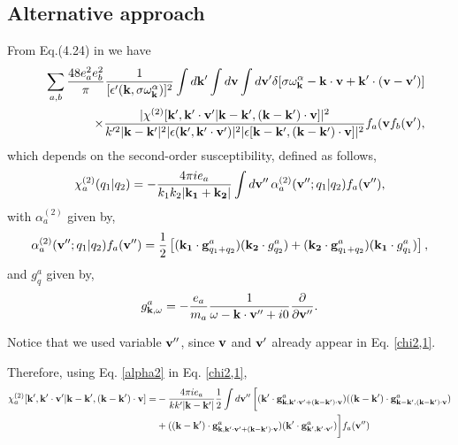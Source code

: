 \documentclass[12pt,a4paper,ruledheader]{report}
\begin{document}
\begin{appendix}
\section{Alternative approach}
From Eq.(4.24) in \cite{YZKS16} we have
\begin{eqnarray}
\label{Eq4.24}
&&
\sum_{a,b}\frac{48e_a^2e_b^2}{\pi}\frac{1}{[\epsilon'({\bf k},\sigma
\omega_{\bf k}^\alpha)]^2}\int d{\bf k'}\int d{\bf v}\int d{\bf v'}
\delta[\sigma\omega_{\bf k}^\alpha-{\bf k\cdot v}+{\bf k'}\cdot
({\bf v-v'})]\\
&&
\times \frac{|\chi^{(2)}[{\bf k'},{\bf k'\cdot v'}|{\bf k-k'},({\bf k-k'})\cdot
{\bf v}]|^2}{k'^2|{\bf k-k'}|^2|\epsilon({\bf k'},{\bf k'\cdot v'})|^2|
\epsilon[{\bf k-k'},({\bf k-k'})\cdot {\bf v}]|^2}f_a({\bf v}f_b({\bf v'}),
\nonumber
\end{eqnarray}
which depends on the second-order susceptibility, defined as follows,
\begin{eqnarray}
\label{chi2,1}
\chi_a^{(2)} (q_1|q_2)=-\frac{4\pi i e_a}{k_1k_2|{\bf k_1}+{\bf k_2}|}
\int d{\bf v''}\, \alpha_a^{(2)}({\bf v''};q_1|q_2)f_a({\bf v''}),
\end{eqnarray}
with $\alpha_a^{(2)}$ given by,
\begin{eqnarray}
\label{alpha2}
\alpha_a^{(2)}({\bf v''};q_1|q_2)f_a({\bf v''})=\frac{1}{2}\left[
({\bf k_1}\cdot{\bf g}_{q_1+q_2}^a)({\bf k_2}\cdot g_{q_2}^a)
+({\bf k_2}\cdot{\bf g}_{q_1+q_2}^a)({\bf k_1}\cdot g_{q_1}^a)\right],
\end{eqnarray}
and $g_q^a$ given by,
\begin{eqnarray}
\label{goper}
g_{{\bf k},\omega}^a=-\frac{e_a}{m_a}\frac{1}{\omega-{\bf k}\cdot{\bf v''}+i0}
\frac{\partial}{\partial {\bf v''}}.
\end{eqnarray}

Notice that we used variable ${\bf v''}$, since ${\bf v}$ and ${\bf v'}$ 
already appear in Eq. \eqref{chi2,1}.

Therefore, using Eq. \eqref{alpha2} in Eq. \eqref{chi2,1},
\begin{equation}
\begin{split}
\chi_a^{(2)}[{\bf k'},{\bf k'\cdot v'}|{\bf k-k'},({\bf k-k'})\cdot{\bf v}]
=&-\frac{4\pi ie_a}{k k'|{\bf k-k'}|}\frac{1}{2}\int d{\bf v''}\,\biggl[
({\bf k'}\cdot
{\bf g}_{{\bf k},{\bf k'}\cdot {\bf v'}+({\bf k-k'})\cdot {\bf v}}^a)
(({\bf k-k'})\cdot 
{\bf g}_{{\bf k-k'},({\bf k-k'})\cdot {\bf v}}^a)\\
&+(({\bf k-k'})\cdot
{\bf g}_{{\bf k},{\bf k'}\cdot {\bf v'}+({\bf k-k'})\cdot {\bf v}}^a)
({\bf k'}\cdot 
{\bf g}_{{\bf k'},{\bf k'}\cdot {\bf v'}}^a)
\biggr] f_a({\bf v''})
\end{split}
\end{equation}


\end{appendix}
\end{document}

